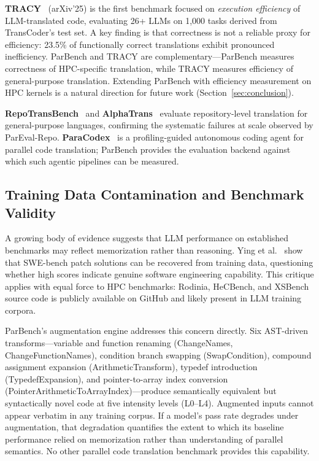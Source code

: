 \documentclass[conference]{IEEEtran}
\begin{document}
\textbf{TRACY}~\cite{TRACY2025} (arXiv'25) is the first benchmark focused on \emph{execution efficiency} of LLM-translated code, evaluating 26+ LLMs on 1,000 tasks derived from TransCoder's test set. A key finding is that correctness is not a reliable proxy for efficiency: 23.5\% of functionally correct translations exhibit pronounced inefficiency. ParBench and TRACY are complementary---ParBench measures correctness of HPC-specific translation, while TRACY measures efficiency of general-purpose translation. Extending ParBench with efficiency measurement on HPC kernels is a natural direction for future work (Section~\ref{sec:conclusion}).

\textbf{RepoTransBench}~\cite{RepoTransBench2025} and \textbf{AlphaTrans}~\cite{AlphaTrans2025} evaluate repository-level translation for general-purpose languages, confirming the systematic failures at scale observed by ParEval-Repo. \textbf{ParaCodex}~\cite{ParaCodex2026} is a profiling-guided autonomous coding agent for parallel code translation; ParBench provides the evaluation backend against which such agentic pipelines can be measured.

\subsection{Training Data Contamination and Benchmark Validity}
\label{sec:contamination}

A growing body of evidence suggests that LLM performance on established benchmarks may reflect memorization rather than reasoning. Ying et al.~\cite{SWEbenchIllusion2025} show that SWE-bench patch solutions can be recovered from training data, questioning whether high scores indicate genuine software engineering capability. This critique applies with equal force to HPC benchmarks: Rodinia, HeCBench, and XSBench source code is publicly available on GitHub and likely present in LLM training corpora.

ParBench's augmentation engine addresses this concern directly. Six AST-driven transforms---variable and function renaming (ChangeNames, ChangeFunctionNames), condition branch swapping (SwapCondition), compound assignment expansion (ArithmeticTransform), typedef introduction (TypedefExpansion), and pointer-to-array index conversion (PointerArithmeticToArrayIndex)---produce semantically equivalent but syntactically novel code at five intensity levels (L0--L4). Augmented inputs cannot appear verbatim in any training corpus. If a model's pass rate degrades under augmentation, that degradation quantifies the extent to which its baseline performance relied on memorization rather than understanding of parallel semantics. No other parallel code translation benchmark provides this capability.
\end{document}
